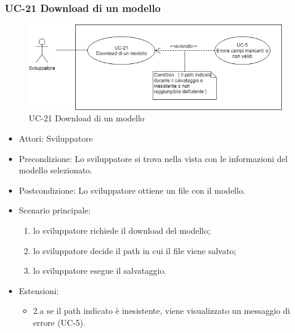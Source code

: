 	\subsubsection{UC-21 Download di un modello}
		\begin{figure}[h]
			\centering
			\includegraphics[scale=0.7]{images/UC-21.png}
			\caption{UC-21 Download di un modello}
		\end{figure}			
		\begin{itemize}
			\item Attori: Sviluppatore
			\item Precondizione: Lo sviluppatore si trova nella vista con le informazioni del modello selezionato.
			\item Postcondizione: Lo sviluppatore ottiene un file con il modello.
			\item Scenario principale:
			\begin{enumerate}
					\item lo sviluppatore richiede il download del modello;
					\item lo sviluppatore decide il path in cui il file viene salvato;
					\item lo sviluppatore esegue il salvataggio.
				\end{enumerate}
			\item Estensioni:
				\begin{itemize}
					\item 2.a se il path indicato è inesistente, viene visualizzato un messaggio di errore (UC-5).
				\end{itemize}
		\end{itemize}
		
